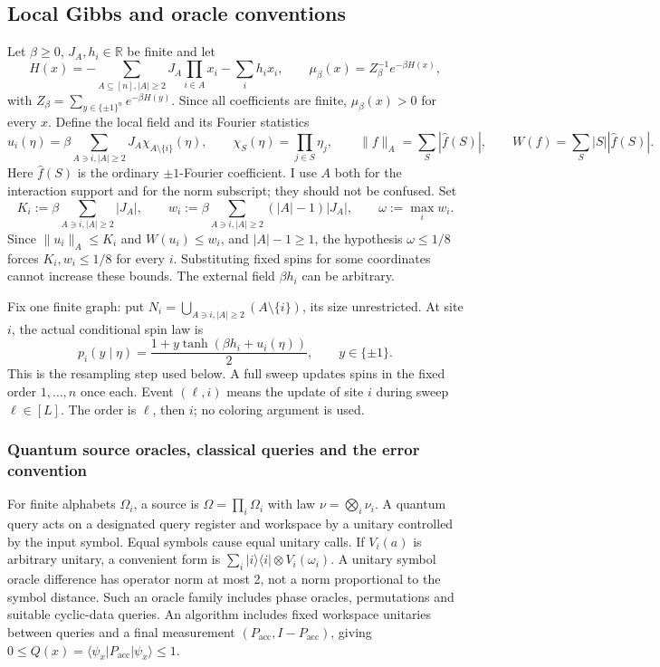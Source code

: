\documentclass[11pt]{article}
\theoremstyle{definition}\newtheorem{definition}[theorem]{Definition}
\theoremstyle{remark}\newtheorem{remark}[theorem]{Remark}
\begin{document}
\subsection{Local Gibbs and oracle conventions}
Let \(\beta\ge0\), \(J_A,h_i\in\mathbb R\) be finite and let
\[
 H(x)=-\sum_{A\subseteq[n],|A|\ge2}J_A\prod_{i\in A}x_i-\sum_ih_ix_i,\qquad
 \mu_\beta(x)=Z_\beta^{-1}e^{-\beta H(x)},
\]
with \(Z_\beta=\sum_{y\in\{\pm1\}^n}e^{-\beta H(y)}\). Since all coefficients are finite, \(\mu_\beta(x)>0\) for every \(x\). Define the local field and its Fourier statistics
\[
 u_i(\eta)=\beta\sum_{A\ni i,|A|\ge2}J_A\chi_{A\setminus\{i\}}(\eta),\qquad
 \chi_S(\eta)=\prod_{j\in S}\eta_j,\qquad
 \|f\|_A=\sum_S|\hat f(S)|,\qquad
 W(f)=\sum_S|S||\hat f(S)|.
\]
Here \(\hat f(S)\) is the ordinary \(\pm1\)-Fourier coefficient. I use \(A\) both for the interaction support and for the norm subscript; they should not be confused. Set
\[
 K_i:=\beta\sum_{A\ni i,|A|\ge2}|J_A|,\qquad
 w_i:=\beta\sum_{A\ni i,|A|\ge2}(|A|-1)|J_A|,\qquad
 \omega:=\max_iw_i.
\]
Since \(\|u_i\|_A\le K_i\) and \(W(u_i)\le w_i\), and \(|A|-1\ge1\), the hypothesis \(\omega\le1/8\) forces \(K_i,w_i\le1/8\) for every \(i\). Substituting fixed spins for some coordinates cannot increase these bounds. The external field \(\beta h_i\) can be arbitrary.

Fix one finite graph: put \(N_i=\bigcup_{A\ni i,|A|\ge2}(A\setminus\{i\})\), its size unrestricted. At site \(i\), the actual conditional spin law is
\[
 p_i(y\mid\eta)=\frac{1+y\tanh(\beta h_i+u_i(\eta))}{2},\qquad y\in\{\pm1\}.
\]
This is the resampling step used below. A full sweep updates spins in the fixed order \(1,\ldots,n\) once each. Event \((\ell,i)\) means the update of site \(i\) during sweep \(\ell\in[L]\). The order is \(\ell\), then \(i\); no coloring argument is used.

\subsubsection{Quantum source oracles, classical queries and the error convention}
For finite alphabets \(\Omega_i\), a source is \(\Omega=\prod_i\Omega_i\) with law \(\nu=\bigotimes_i\nu_i\). A quantum query acts on a designated query register and workspace by a unitary controlled by the input symbol. Equal symbols cause equal unitary calls. If \(V_i(a)\) is arbitrary unitary, a convenient form is \(\sum_i|i\rangle\langle i|\otimes V_i(\omega_i)\). A unitary symbol oracle difference has operator norm at most 2, not a norm proportional to the symbol distance. Such an oracle family includes phase oracles, permutations and suitable cyclic-data queries. An algorithm includes fixed workspace unitaries between queries and a final measurement \((P_{\mathrm{acc}},I-P_{\mathrm{acc}})\), giving \(0\le Q(x)=\langle\psi_x|P_{\mathrm{acc}}|\psi_x\rangle\le1\).
\end{document}

